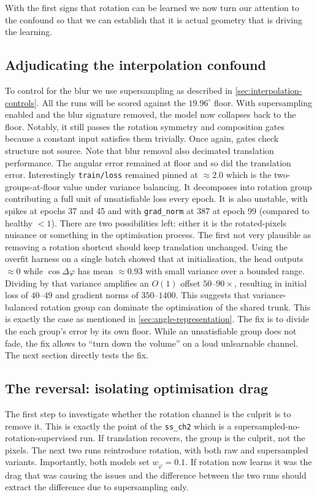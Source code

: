 \documentclass[final_report.tex]{subfiles}
\begin{document}
With the first signs that rotation can be learned we now turn our attention to the confound so that we can establish that it is actual geometry that is driving the learning.

\subsection{Adjudicating the interpolation confound}\label{sec:adjudication}
To control for the blur we use supersampling as described in \cref{sec:interpolation-controls}. All the runs will be scored against the $19.96^\circ$ floor. With supersampling enabled and the blur signature removed, the model now collapses back to the floor. Notably, it still passes the rotation symmetry and composition gates because a constant input satisfies them trivially. Once again, gates check structure not source. Note that blur removal also decimated translation performance. The angular error remained at floor and so did the translation error. Interestingly \texttt{train/loss} remained pinned at $\approx2.0$ which is the two-groups-at-floor value under variance balancing. It decomposes into rotation group contributing a full unit of unsatisfiable loss every epoch. It is also unstable, with spikes at epochs 37 and 45 and with \texttt{grad\_norm} at 387 at epoch 99 (compared to healthy $<1$). There are two possibilities left: either it is the rotated-pixels nuisance or something in the optimisation process. The first not very plausible as removing a rotation shortcut should keep translation unchanged. Using the overfit harness on a single batch showed that at initialisation, the head outputs $\approx 0$ while $\cos\Delta\varphi$ has mean $\approx0.93$ with small variance over a bounded range. Dividing by that variance amplifies an $O(1)$ offset $50$--$90\times$, resulting in initial loss of $40$--$49$ and gradient norms of $350$--$1400$. This suggests that variance-balanced rotation group can dominate the optimisation of the shared trunk. This is exactly the case as mentioned in \cref{sec:angle-representation}. The fix is to divide the each group's error by its own floor. While an unsatisfiable group does not fade, the fix allows to ``turn down the volume'' on a loud unlearnable channel. The next section directly tests the fix.

\subsection{The reversal: isolating optimisation drag}\label{sec:reversal}
The first step to investigate whether the rotation channel is the culprit is to remove it. This is exactly the point of the \texttt{ss\_ch2} which is a supersampled-no-rotation-supervised run. If translation recovers, the group is the culprit, not the pixels. The next two runs reintroduce rotation, with both raw and supersampled variants. Importantly, both models set $w_\varphi = 0.1$. If rotation now learns it was the drag that was causing the issues and the difference between the two runs should extract the difference due to supersampling only. 
\end{document}
